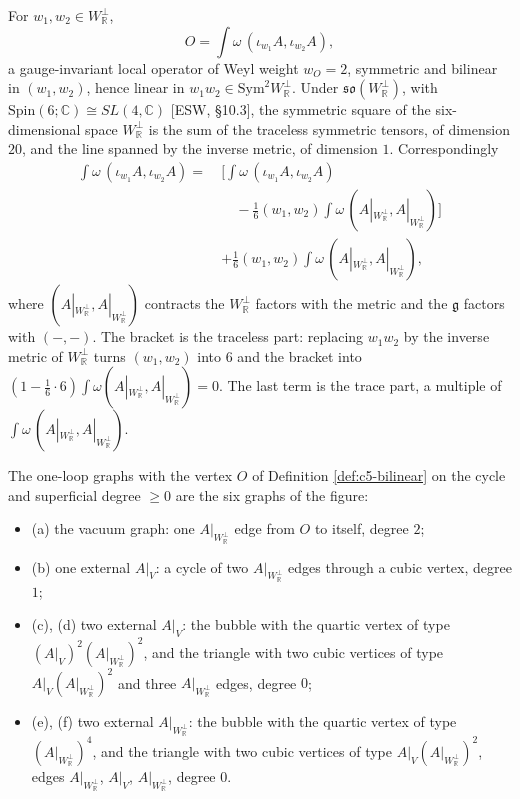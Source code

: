 \begin{definition}
\label{def:c5-bilinear}
For $w_1,w_2\in W_{\mathbb R}^\perp$,
\[
O=\int\omega\,(\iota_{w_1}A,\iota_{w_2}A),
\]
a gauge-invariant local operator of Weyl weight $w_O=2$, symmetric and bilinear in $(w_1,w_2)$, hence linear in $w_1w_2\in\mathrm{Sym}^2W_{\mathbb R}^\perp$. Under $\mathfrak{so}(W_{\mathbb R}^\perp)$, with $\mathrm{Spin}(6;\mathbb C)\cong SL(4,\mathbb C)$ [ESW, §10.3], the symmetric square of the six-dimensional space $W_{\mathbb R}^\perp$ is the sum of the traceless symmetric tensors, of dimension $20$, and the line spanned by the inverse metric, of dimension $1$. Correspondingly
\begin{equation}
\begin{aligned}
\int\omega\,(\iota_{w_1}A,\iota_{w_2}A)=\ &\Big[\int\omega\,(\iota_{w_1}A,\iota_{w_2}A)\\
&\quad-\tfrac16(w_1,w_2)\int\omega\,(A|_{W_{\mathbb R}^\perp},A|_{W_{\mathbb R}^\perp})\Big]\\
&+\tfrac16(w_1,w_2)\int\omega\,(A|_{W_{\mathbb R}^\perp},A|_{W_{\mathbb R}^\perp}),
\end{aligned}
\label{eq:c5-decomp}
\end{equation}
where $(A|_{W_{\mathbb R}^\perp},A|_{W_{\mathbb R}^\perp})$ contracts the $W_{\mathbb R}^\perp$ factors with the metric and the $\mathfrak g$ factors with $(-,-)$. The bracket is the traceless part: replacing $w_1w_2$ by the inverse metric of $W_{\mathbb R}^\perp$ turns $(w_1,w_2)$ into $6$ and the bracket into $(1-\tfrac16\cdot6)\int\omega(A|_{W_{\mathbb R}^\perp},A|_{W_{\mathbb R}^\perp})=0$. The last term is the trace part, a multiple of $\int\omega\,(A|_{W_{\mathbb R}^\perp},A|_{W_{\mathbb R}^\perp})$.
\end{definition}

\begin{proposition}
\label{prop:c5-census}
The one-loop graphs with the vertex $O$ of Definition \ref{def:c5-bilinear} on the cycle and superficial degree $\ge0$ are the six graphs of the figure:
\begin{itemize}
\item (a) the vacuum graph: one $A|_{W_{\mathbb R}^\perp}$ edge from $O$ to itself, degree $2$;
\item (b) one external $A|_V$: a cycle of two $A|_{W_{\mathbb R}^\perp}$ edges through a cubic vertex, degree $1$;
\item (c), (d) two external $A|_V$: the bubble with the quartic vertex of type $(A|_V)^2(A|_{W_{\mathbb R}^\perp})^2$, and the triangle with two cubic vertices of type $A|_V(A|_{W_{\mathbb R}^\perp})^2$ and three $A|_{W_{\mathbb R}^\perp}$ edges, degree $0$;
\item (e), (f) two external $A|_{W_{\mathbb R}^\perp}$: the bubble with the quartic vertex of type $(A|_{W_{\mathbb R}^\perp})^4$, and the triangle with two cubic vertices of type $A|_V(A|_{W_{\mathbb R}^\perp})^2$, edges $A|_{W_{\mathbb R}^\perp}$, $A|_V$, $A|_{W_{\mathbb R}^\perp}$, degree $0$.
\end{itemize}
\end{proposition}

